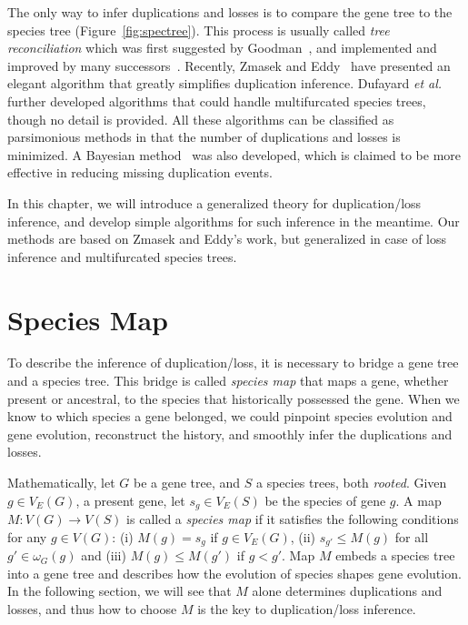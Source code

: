 The only way to infer duplications and losses is to compare the gene tree
to the species tree (Figure~\ref{fig:spectree}). This process is usually called \emph{tree reconciliation}
which was first suggested by Goodman~\cite{goodman79}, and implemented and improved by
many successors~\cite{page94,guigo96,eulenstein98}.
Recently, Zmasek and Eddy~\cite{zmasek01} have presented an elegant algorithm that greatly
simplifies duplication inference. Dufayard {\it et al.}~\cite{dufayard05} further developed
algorithms that could handle multifurcated species trees, though no detail is
provided. All these algorithms can be classified as parsimonious methods in
that the number of duplications and losses is minimized. A Bayesian method~\cite{arvestad03}
was also developed, which is claimed to be more effective in reducing missing duplication events.

In this chapter, we will introduce a generalized theory for duplication/loss inference,
and develop simple algorithms for such inference in the meantime. Our methods are based
on Zmasek and Eddy's work, but generalized in case of loss inference and
multifurcated species trees.

\section{Species Map}\label{sec:specmap}

To describe the inference of duplication/loss, it is necessary to bridge a gene tree
and a species tree. This bridge is called \emph{species map} that maps a gene, whether present or ancestral,
to the species that historically possessed the gene. When we know to which species a gene belonged,
we could pinpoint species evolution and gene evolution, reconstruct the history,
and smoothly infer the duplications and losses.

Mathematically, let $G$ be a gene tree, and $S$ a species trees, both \emph{rooted}.
Given $g\in V_E(G)$, a present gene, let $s_g\in V_E(S)$ be the species of gene $g$.
A map $M:V(G)\rightarrow V(S)$ is called a \emph{species map} if it satisfies the following
conditions for any $g\in V(G)$: (i) $M(g)=s_g$ if $g\in V_E(G)$, (ii) $s_{g'}\leq M(g)$ for all
$g'\in\omega_G(g)$ and (iii) $M(g)\leq M(g')$ if $g<g'$. Map $M$ embeds a species tree into
a gene tree and describes how the evolution of species shapes gene evolution.
In the following section, we will see that $M$ alone determines duplications and losses, and
thus how to choose $M$ is the key to duplication/loss inference.

